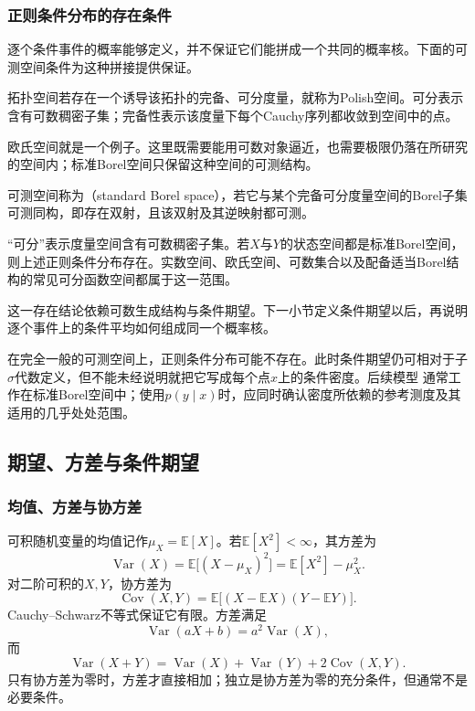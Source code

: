 \subsubsection{正则条件分布的存在条件}

逐个条件事件的概率能够定义，并不保证它们能拼成一个共同的概率核。下面的可测空间条件为这种拼接提供保证。
\begin{definition}[Polish空间]
  \label{def:probability-polish-space}
拓扑空间若存在一个诱导该拓扑的完备、可分度量，就称为Polish空间。可分表示含有可数稠密子集；完备性表示该度量下每个Cauchy序列都收敛到空间中的点。
\end{definition}
欧氏空间就是一个例子。这里既需要能用可数对象逼近，也需要极限仍落在所研究的空间内；标准Borel空间只保留这种空间的可测结构。
\begin{definition}[标准Borel空间]
  \label{def:probability-standard-borel-space}
  可测空间称为（standard Borel space），若它与某个完备可分度量空间的Borel子集可测同构，即存在双射，且该双射及其逆映射都可测。
\end{definition}
“可分”表示度量空间含有可数稠密子集。若\(X\)与\(Y\)的状态空间都是标准Borel空间，则上述正则条件分布存在。实数空间、欧氏空间、可数集合以及配备适当Borel结构的常见可分函数空间都属于这一范围。

这一存在结论依赖可数生成结构与条件期望。下一小节定义条件期望以后，再说明逐个事件上的条件平均如何组成同一个概率核。

在完全一般的可测空间上，正则条件分布可能不存在。此时条件期望仍可相对于子\(\sigma\)代数定义，但不能未经说明就把它写成每个点\(x\)上的条件密度。后续模型
通常工作在标准Borel空间中；使用\(p(y\mid x)\)时，应同时确认密度所依赖的参考测度及其适用的几乎处处范围。

\subsection{期望、方差与条件期望}
\label{sec:probability-expectation-conditional-expectation}

\subsubsection{均值、方差与协方差}

可积随机变量的均值记作\(\mu_X=\mathbb{E}[X]\)。若\(\mathbb{E}[X^2]<\infty\)，其方差为
\[ \operatorname{Var}(X)
  =\mathbb{E}\bigl[(X-\mu_X)^2\bigr]=\mathbb{E}[X^2]-\mu_X^2. \]
对二阶可积的\(X,Y\)，协方差为
\[ \operatorname{Cov}(X,Y)
  =\mathbb{E}\bigl[(X-\mathbb{E}X)(Y-\mathbb{E}Y)\bigr]. \]
Cauchy--Schwarz不等式保证它有限。方差满足
\[ \operatorname{Var}(aX+b)=a^2\operatorname{Var}(X), \]
而
\[ \operatorname{Var}(X+Y)
  =\operatorname{Var}(X)+\operatorname{Var}(Y)+2\operatorname{Cov}(X,Y). \]
只有协方差为零时，方差才直接相加；独立是协方差为零的充分条件，但通常不是必要条件。

